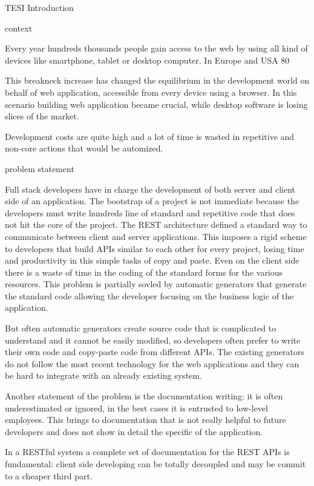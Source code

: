 TESI
Introduction

context 

Every year hundreds thousands people gain access to the web by using all kind of devices like smartphone, tablet or desktop computer. In Europe and USA 80%

This breakneck increase has changed the equilibrium in the development world on behalf of web application, accessible from every device using a browser.
In this scenario building web application became crucial, while desktop software is losing slices of the market.

Development costs are quite high and a lot of time is wasted in repetitive and non-core actions that would be automized.

problem statement

Full stack developers have in charge the development of both server and client side of an application. The bootstrap of a project is not immediate because the developers must write hundreds line of standard and repetitive code that does not hit the core of the project.
The REST architecture defined a standard way to communicate between client and server applications. This imposes a rigid scheme to developers that build APIs similar to each other for every project, losing time and productivity in this simple tasks of copy and paste.
Even on the client side there is a waste of time in the coding of the standard forms for the various resources.
This problem is partially sovled by automatic generators that generate the standard code allowing the developer focusing on the business logic of the application.


But often automatic generators create source code that is complicated to understand and it cannot be easily modified, so developers often prefer to write their own code and copy-paste code from different APIs. The existing generators do not follow the most recent technology for the web applications and they can be hard to integrate with an already existing system.

Another statement of the problem is the documentation writing: it is often underestimated or ignored, in the best cases it is entrusted to low-level employees.
This brings to documentation that is not really helpful to future developers and does not show in detail the specific of the application.

In a RESTful system a complete set of documentation for the REST APIs is fundamental: client side developing can be totally decoupled and may be commit to a cheaper third part.


